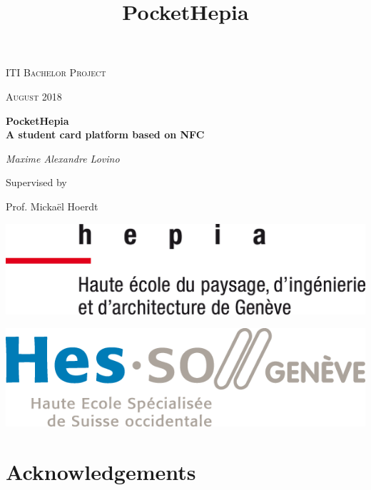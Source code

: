 \documentclass[11pt,a4paper]{report}
\title{PocketHepia}
\begin{document}
\begin{titlepage}
	\centering
	{\scshape \LARGE ITI Bachelor Project \par}
	\vspace{1cm}
	{\scshape\Large August 2018\par}
	\vspace{1.5cm}
	{\huge\bfseries PocketHepia\\A student card platform based on NFC \par}
	\vspace{2cm}
	{\Large\itshape Maxime Alexandre Lovino\par}
	\vfill
	Supervised by\par
	Prof. Mickaël Hoerdt
	\vfill
		\begin{minipage}{.5\textwidth}
		\centering
		\includegraphics[width=.7\linewidth]{assets/logo_hepia.png}
	\end{minipage}%
	\begin{minipage}{.5\textwidth}
		\centering
		\includegraphics[width=.7\linewidth]{assets/logo_hes.png}
	\end{minipage}
\end{titlepage}
\shipout\null
{}
\tableofcontents
\newpage
\listoffigures
\newpage
\renewcommand\listoflistingscaption{Source code listings}
\listoflistings
\newpage
\listoftables
\newpage
\chapter*{Acknowledgements}
\glsaddall
\printglossary[title=Terms and Definitions]
\newpage
\shipout\null
{}
\end{document}
